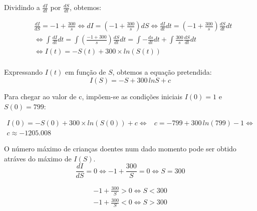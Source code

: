 \documentclass[portuguese, a4paper]{article}
\begin{document}
	\subsection{}
		\subsubsection{}
		\par %
		\par
		Dividindo a $\frac{dI}{dt}$ por $\frac{dS}{dt}$, obtemos:

		\begin{equation} \label{di}
		\begin{split}
			& \frac{dI}{dS} = -1 + \frac{300}{s}
			\Leftrightarrow dI = \left(-1 + \frac{300}{s}\right)dS
			 \Leftrightarrow \frac{dI}{dt} dt = \left( -1 + \frac{300}{s}\right) \frac{dS}{dt} dt \\ 
			& \Leftrightarrow \int\frac{dI}{dt}dt = \int\left(\frac{-1 + 300}{s}\right)\frac{dS}{dt}dt =
			\int - \frac{ds}{dt}dt + \int\frac{300}{s}\frac{dS}{dt}dt \\
			& \Leftrightarrow I(t) = -S(t) + 300 \times ln(S(t)) \\
		\end{split}
		\end{equation}

		Expressando $I(t)$ em função de $S$, obtemos a equação pretendida:
        $$I(S) = -S + 300\, ln S + c$$

		\vspace{5mm}
		Para chegar ao valor de c, impõem-se as condições iniciais $I(0) = 1$ e $S(0) = 799$:

		\begin{equation}
		\begin{split}
		I(0) = -S(0) + 300 \times ln(S(0)) + c \Leftrightarrow & c = -799 +
		300\,ln(799) - 1 \Leftrightarrow \\
		c \approx -1205.008
		\end{split}
		\end{equation}


		O número máximo de crianças doentes num dado momento pode ser obtido
		atráves do máximo de $I(S)$.
		\begin{equation}
			\label{eq:root}
			\frac{dI}{dS} = 0 \Leftrightarrow -1 + \frac{300}{S} = 0
			\Leftrightarrow S = 300
		\end{equation}

		\begin{equation}
		\begin{split}
			\label{eq:comp}
			 -1 + \frac{300}{S} > 0 \Leftrightarrow S < 300 \\
			 -1 + \frac{300}{S} < 0 \Leftrightarrow S > 300
		\end{split}
		\end{equation}
\end{document}
